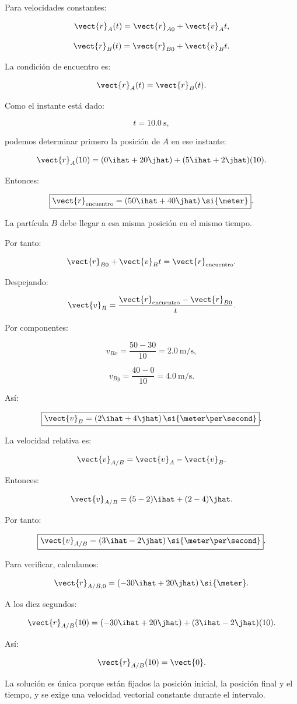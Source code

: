 \begin{explicacion}
Para velocidades constantes:

\[
\vect{r}_A(t)
=
\vect{r}_{A0}+\vect{v}_At,
\]

\[
\vect{r}_B(t)
=
\vect{r}_{B0}+\vect{v}_Bt.
\]

La condición de encuentro es:

\[
\vect{r}_A(t)=\vect{r}_B(t).
\]

Como el instante está dado:

\[
t=\SI{10.0}{\second},
\]

podemos determinar primero la posición
de \(A\) en ese instante:

\[
\vect{r}_A(10)
=
(0\ihat+20\jhat)
+
(5\ihat+2\jhat)(10).
\]

Entonces:

\[
\boxed{
\vect{r}_{\mathrm{encuentro}}
=
(50\ihat+40\jhat)\,\si{\meter}
}.
\]

La partícula \(B\) debe llegar
a esa misma posición en el mismo tiempo.

Por tanto:

\[
\vect{r}_{B0}+\vect{v}_Bt
=
\vect{r}_{\mathrm{encuentro}}.
\]

Despejando:

\[
\vect{v}_B
=
\frac{
\vect{r}_{\mathrm{encuentro}}
-
\vect{r}_{B0}
}{t}.
\]

Por componentes:

\[
v_{Bx}
=
\frac{50-30}{10}
=
\SI{2.0}{\meter\per\second},
\]

\[
v_{By}
=
\frac{40-0}{10}
=
\SI{4.0}{\meter\per\second}.
\]

Así:

\[
\boxed{
\vect{v}_B
=
(2\ihat+4\jhat)\,
\si{\meter\per\second}
}.
\]

La velocidad relativa es:

\[
\vect{v}_{A/B}
=
\vect{v}_A-\vect{v}_B.
\]

Entonces:

\[
\vect{v}_{A/B}
=
(5-2)\ihat+(2-4)\jhat.
\]

Por tanto:

\[
\boxed{
\vect{v}_{A/B}
=
(3\ihat-2\jhat)\,
\si{\meter\per\second}
}.
\]

Para verificar, calculamos:

\[
\vect{r}_{A/B,0}
=
(-30\ihat+20\jhat)\,\si{\meter}.
\]

A los diez segundos:

\[
\vect{r}_{A/B}(10)
=
(-30\ihat+20\jhat)
+
(3\ihat-2\jhat)(10).
\]

Así:

\[
\vect{r}_{A/B}(10)=\vect{0}.
\]

La solución es única porque están fijados
la posición inicial, la posición final
y el tiempo, y se exige una velocidad
vectorial constante durante el intervalo.
\end{explicacion}